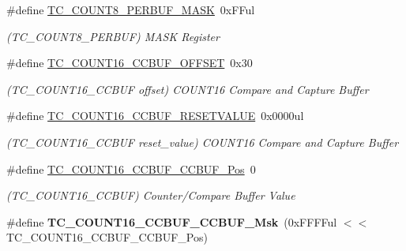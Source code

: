 \begin{DoxyCompactItemize}
\item 
\hypertarget{group___s_a_m_l21___t_c_ga8413dd62c3b16d704477601ec9e4a659}{}\#define \hyperlink{group___s_a_m_l21___t_c_ga8413dd62c3b16d704477601ec9e4a659}{T\+C\+\_\+\+C\+O\+U\+N\+T8\+\_\+\+P\+E\+R\+B\+U\+F\+\_\+\+M\+A\+S\+K}~0x\+F\+Ful\label{group___s_a_m_l21___t_c_ga8413dd62c3b16d704477601ec9e4a659}

\begin{DoxyCompactList}\small\item\em (T\+C\+\_\+\+C\+O\+U\+N\+T8\+\_\+\+P\+E\+R\+B\+U\+F) M\+A\+S\+K Register \end{DoxyCompactList}\item 
\hypertarget{group___s_a_m_l21___t_c_gad282e3af84350b9fac76204047caca62}{}\#define \hyperlink{group___s_a_m_l21___t_c_gad282e3af84350b9fac76204047caca62}{T\+C\+\_\+\+C\+O\+U\+N\+T16\+\_\+\+C\+C\+B\+U\+F\+\_\+\+O\+F\+F\+S\+E\+T}~0x30\label{group___s_a_m_l21___t_c_gad282e3af84350b9fac76204047caca62}

\begin{DoxyCompactList}\small\item\em (T\+C\+\_\+\+C\+O\+U\+N\+T16\+\_\+\+C\+C\+B\+U\+F offset) C\+O\+U\+N\+T16 Compare and Capture Buffer \end{DoxyCompactList}\item 
\hypertarget{group___s_a_m_l21___t_c_gafa6957c15d0630d0dc3ec3c0ad37eea9}{}\#define \hyperlink{group___s_a_m_l21___t_c_gafa6957c15d0630d0dc3ec3c0ad37eea9}{T\+C\+\_\+\+C\+O\+U\+N\+T16\+\_\+\+C\+C\+B\+U\+F\+\_\+\+R\+E\+S\+E\+T\+V\+A\+L\+U\+E}~0x0000ul\label{group___s_a_m_l21___t_c_gafa6957c15d0630d0dc3ec3c0ad37eea9}

\begin{DoxyCompactList}\small\item\em (T\+C\+\_\+\+C\+O\+U\+N\+T16\+\_\+\+C\+C\+B\+U\+F reset\+\_\+value) C\+O\+U\+N\+T16 Compare and Capture Buffer \end{DoxyCompactList}\item 
\hypertarget{group___s_a_m_l21___t_c_gaa82f4b8e0681376c024b934cc3e47d6a}{}\#define \hyperlink{group___s_a_m_l21___t_c_gaa82f4b8e0681376c024b934cc3e47d6a}{T\+C\+\_\+\+C\+O\+U\+N\+T16\+\_\+\+C\+C\+B\+U\+F\+\_\+\+C\+C\+B\+U\+F\+\_\+\+Pos}~0\label{group___s_a_m_l21___t_c_gaa82f4b8e0681376c024b934cc3e47d6a}

\begin{DoxyCompactList}\small\item\em (T\+C\+\_\+\+C\+O\+U\+N\+T16\+\_\+\+C\+C\+B\+U\+F) Counter/\+Compare Buffer Value \end{DoxyCompactList}\item 
\hypertarget{group___s_a_m_l21___t_c_ga77bce9c7b9790414b7f330e16b526fbd}{}\#define {\bfseries T\+C\+\_\+\+C\+O\+U\+N\+T16\+\_\+\+C\+C\+B\+U\+F\+\_\+\+C\+C\+B\+U\+F\+\_\+\+Msk}~(0x\+F\+F\+F\+Ful $<$$<$ T\+C\+\_\+\+C\+O\+U\+N\+T16\+\_\+\+C\+C\+B\+U\+F\+\_\+\+C\+C\+B\+U\+F\+\_\+\+Pos)\label{group___s_a_m_l21___t_c_ga77bce9c7b9790414b7f330e16b526fbd}


\end{DoxyCompactItemize}
